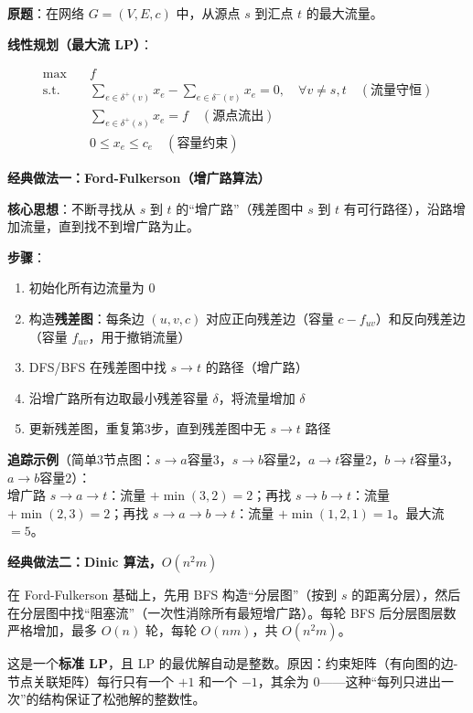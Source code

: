 \documentclass[12pt, a4paper]{ctexart}
\begin{document}
\begin{blackboard}

\textbf{原题}：在网络 $G = (V, E, c)$ 中，从源点 $s$ 到汇点 $t$ 的最大流量。

\textbf{线性规划（最大流 LP）}：

\begin{align}
\max \quad & f \\
\text{s.t.} \quad & \sum_{e \in \delta^+(v)} x_e - \sum_{e \in \delta^-(v)} x_e = 0, \quad \forall v \neq s, t \quad (\text{流量守恒}) \\
& \sum_{e \in \delta^+(s)} x_e = f \quad (\text{源点流出}) \\
& 0 \leq x_e \leq c_e \quad (\text{容量约束})
\end{align}

\textbf{经典做法一：Ford-Fulkerson（增广路算法）}

\textbf{核心思想}：不断寻找从 $s$ 到 $t$ 的``增广路''（残差图中 $s$ 到 $t$ 有可行路径），沿路增加流量，直到找不到增广路为止。

\textbf{步骤}：
\begin{enumerate}
    \item 初始化所有边流量为 0
    \item 构造\textbf{残差图}：每条边 $(u,v,c)$ 对应正向残差边（容量 $c-f_{uv}$）和反向残差边（容量 $f_{uv}$，用于撤销流量）
    \item DFS/BFS 在残差图中找 $s \to t$ 的路径（增广路）
    \item 沿增广路所有边取最小残差容量 $\delta$，将流量增加 $\delta$
    \item 更新残差图，重复第3步，直到残差图中无 $s \to t$ 路径
\end{enumerate}

\textbf{追踪示例}（简单3节点图：$s \to a$容量3，$s \to b$容量2，$a \to t$容量2，$b \to t$容量3，$a \to b$容量2）：\\
增广路 $s\to a\to t$：流量 $+\min(3,2)=2$；再找 $s\to b\to t$：流量 $+\min(2,3)=2$；再找 $s\to a\to b\to t$：流量 $+\min(1,2,1)=1$。最大流 $=5$。

\textbf{经典做法二：Dinic 算法，$O(n^2 m)$}

在 Ford-Fulkerson 基础上，先用 BFS 构造``分层图''（按到 $s$ 的距离分层），然后在分层图中找``阻塞流''（一次性消除所有最短增广路）。每轮 BFS 后分层图层数严格增加，最多 $O(n)$ 轮，每轮 $O(nm)$，共 $O(n^2 m)$。

这是一个\textbf{标准 LP}，且 LP 的最优解自动是整数。原因：约束矩阵（有向图的边-节点关联矩阵）每行只有一个 $+1$ 和一个 $-1$，其余为 0——这种``每列只进出一次''的结构保证了松弛解的整数性。


\end{blackboard}
\end{document}
